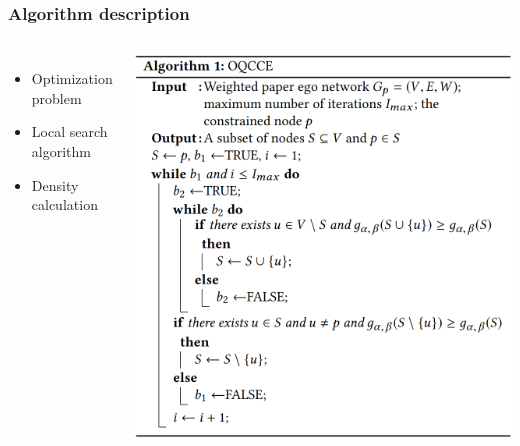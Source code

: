 \begin{frame}
\frametitle{Algorithm description}
\begin{columns}

\begin{itemize}
    \item Optimization problem
    \item Local search algorithm
    \item Density calculation
\end{itemize}

\includegraphics[width=1\linewidth]{img/algorithm}


\end{columns}
\end{frame}
